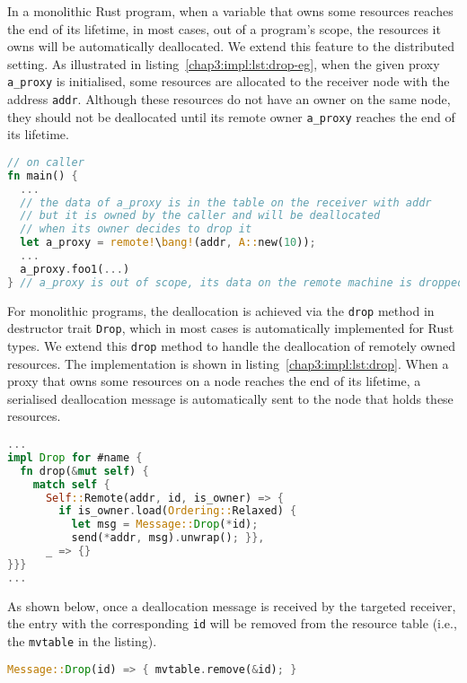 In a monolithic Rust program, when a variable that owns some resources reaches the end of its lifetime, in most cases, out of a program's scope, the resources it owns will be automatically deallocated. We extend this feature to the distributed setting. As illustrated in listing~\ref{chap3:impl:lst:drop-eg}, when the given proxy \texttt{a\_proxy} is initialised, some resources are allocated to the receiver node with the address \texttt{addr}. Although these resources do not have an owner on the same node, they should not be deallocated until its remote owner \texttt{a\_proxy} reaches the end of its lifetime. 
\begin{lstlisting}[language=Rust, style=boxed, basicstyle=\footnotesize\ttfamily, caption={An example of a remote deallocation}, label=chap3:impl:lst:drop-eg]
// on caller
fn main() {
  ...
  // the data of a_proxy is in the table on the receiver with addr
  // but it is owned by the caller and will be deallocated
  // when its owner decides to drop it
  let a_proxy = remote!\bang!(addr, A::new(10)); 
  ...
  a_proxy.foo1(...)
} // a_proxy is out of scope, its data on the remote machine is dropped
\end{lstlisting}

For monolithic programs, the deallocation is achieved via the \texttt{drop} method in destructor trait \texttt{Drop}, which in most cases is automatically implemented for Rust types. We extend this \texttt{drop} method to handle the deallocation of remotely owned resources. The implementation is shown in listing~\ref{chap3:impl:lst:drop}.
When a proxy that owns some resources on a node reaches the end of its lifetime, a serialised deallocation message is automatically sent to the node that holds these resources. 
\begin{lstlisting}[language=Rust, style=boxed, basicstyle=\footnotesize\ttfamily, caption={The implementation of a remote deallocation}, label=chap3:impl:lst:drop]
...
impl Drop for #name {
  fn drop(&mut self) {
    match self {
      Self::Remote(addr, id, is_owner) => {
        if is_owner.load(Ordering::Relaxed) {
          let msg = Message::Drop(*id);
          send(*addr, msg).unwrap(); }},
      _ => {}
}}}
...
\end{lstlisting}
As shown below, once a deallocation message is received by the targeted receiver, the entry with the corresponding \texttt{id} will be removed from the resource table (i.e., the \texttt{mvtable} in the listing). 
\begin{lstlisting}[language=Rust, style=boxed, basicstyle=\footnotesize\ttfamily]
Message::Drop(id) => { mvtable.remove(&id); }
\end{lstlisting}

